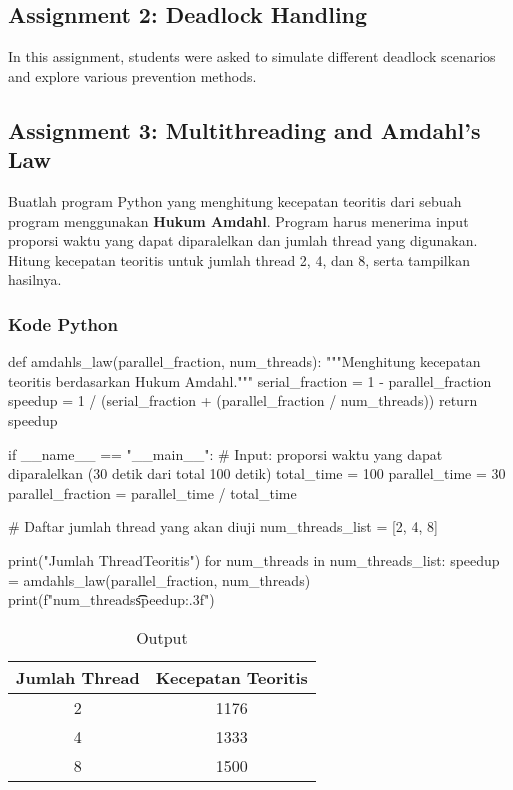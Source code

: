 \documentclass[12pt]{article}
\begin{document}
\subsection{Assignment 2: Deadlock Handling}
In this assignment, students were asked to simulate different deadlock scenarios and explore various prevention methods.

\subsection{Assignment 3: Multithreading and Amdahl's Law}
Buatlah program Python yang menghitung kecepatan teoritis dari sebuah program menggunakan \textbf{Hukum Amdahl}. Program harus menerima input proporsi waktu yang dapat diparalelkan dan jumlah thread yang digunakan. Hitung kecepatan teoritis untuk jumlah thread 2, 4, dan 8, serta tampilkan hasilnya. 
\subsubsection{Kode Python}
\begin{python}
    def amdahls_law(parallel_fraction, num_threads):
    """Menghitung kecepatan teoritis berdasarkan Hukum Amdahl."""
    serial_fraction = 1 - parallel_fraction
    speedup = 1 / (serial_fraction + (parallel_fraction / num_threads))
    return speedup

    if __name__ == "__main__":
        # Input: proporsi waktu yang dapat diparalelkan (30 detik dari total 100 detik)
        total_time = 100
        parallel_time = 30
        parallel_fraction = parallel_time / total_time
    
        # Daftar jumlah thread yang akan diuji
        num_threads_list = [2, 4, 8]
    
        print("Jumlah Thread\tKecepatan Teoritis")
        for num_threads in num_threads_list:
            speedup = amdahls_law(parallel_fraction, num_threads)
            print(f"{num_threads}\t\t{speedup:.3f}")
\end{python}

\begin{table}[htbp] %
    \centering
    \begin{tabular}{|c|c|} %
    \hline
    Jumlah Thread& Kecepatan Teoritis\\ %
    \hline
    2& 1176\\ \hline 
 4& 1333\\ \hline 
 8& 1500\\\hline
    \end{tabular}
    \caption{Output} %
    \label{tab:your_label} %
\end{table}
\end{document}
